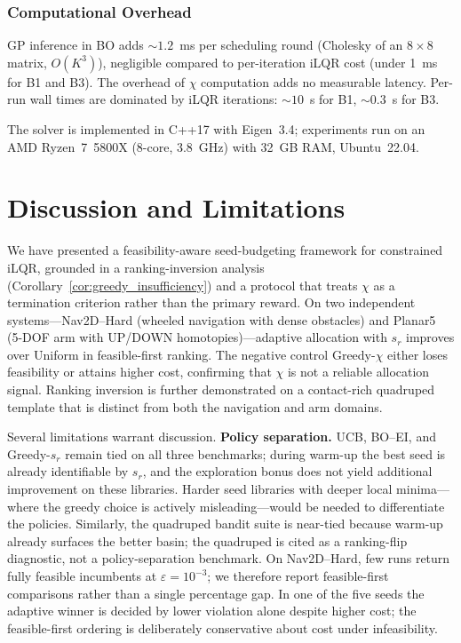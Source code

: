 \documentclass[lettersize,journal]{IEEEtran}
\begin{document}
\subsubsection{Computational Overhead}

GP inference in BO adds $\sim\!1.2$~ms per scheduling round (Cholesky of an
$8\times8$ matrix, $O(K^3)$), negligible compared to per-iteration iLQR cost
(under 1~ms for B1 and B3).  The overhead of $\chi$ computation adds no
measurable latency.  Per-run wall times are dominated by iLQR iterations:
$\sim\!10$~s for B1, $\sim\!0.3$~s for B3.

The solver is implemented in C++17 with Eigen~3.4; experiments run on an
AMD Ryzen~7~5800X (8-core, 3.8~GHz) with 32~GB RAM, Ubuntu~22.04.
\section{Discussion and Limitations}
We have presented a feasibility-aware seed-budgeting framework for
constrained iLQR, grounded in a ranking-inversion analysis
(Corollary~\ref{cor:greedy_insufficiency}) and a protocol that treats
$\chi$ as a termination criterion rather than the primary reward.
On two independent systems---Nav2D--Hard (wheeled navigation with dense
obstacles) and Planar5 (5-DOF arm with UP/DOWN homotopies)---adaptive
allocation with $s_r$ improves over Uniform in feasible-first ranking.
The negative control Greedy-$\chi$ either loses feasibility or attains
higher cost, confirming that $\chi$ is not a reliable allocation signal.
Ranking inversion is further demonstrated on a contact-rich quadruped
template that is distinct from both the navigation and arm domains.

Several limitations warrant discussion.  \textbf{Policy separation.}
UCB, BO--EI, and Greedy-$s_r$ remain tied on all three benchmarks;
during warm-up the best seed is already identifiable by $s_r$, and the
exploration bonus does not yield additional improvement on these
libraries.  Harder seed libraries with deeper local minima---where the
greedy choice is actively misleading---would be needed to differentiate
the policies.  Similarly, the quadruped bandit suite is near-tied because
warm-up already surfaces the better basin; the quadruped is cited as a
ranking-flip diagnostic, not a policy-separation benchmark.  On
Nav2D--Hard, few runs return fully feasible incumbents at
$\varepsilon=10^{-3}$; we therefore report feasible-first comparisons
rather than a single percentage gap.  In one of the five seeds the
adaptive winner is decided by lower violation alone despite higher cost;
the feasible-first ordering is deliberately conservative about cost under
infeasibility.
\end{document}
